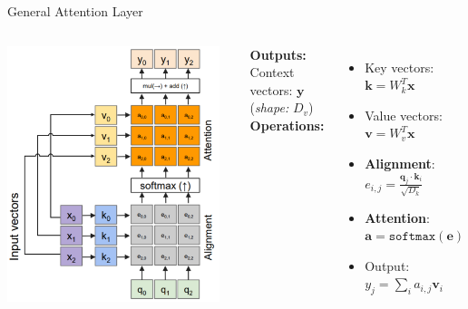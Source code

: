 \documentclass[serif, aspectratio=169]{beamer}
\begin{document}
\begin{frame}{General Attention Layer}
	\begin{columns}
		
		\includegraphics[width=0.95\textwidth]{pic/General-Attention-Layer-1.png}
		
		\textbf{Outputs:} \\
		Context vectors: $\mathbf{y}$ (\textit{shape: } $D_v$) \\[1em]
		
		\textbf{Operations:}
		\begin{itemize}
			\item Key vectors: $\mathbf{k} = W_k^T \mathbf{x}$
			\item Value vectors: $\mathbf{v} = W_v^T \mathbf{x}$
			\item \textbf{Alignment}: $e_{i,j} = \frac{\mathbf{q}_j \cdot \mathbf{k}_i}{\sqrt{D_k}}$
			\item \textbf{Attention}: $\mathbf{a} = \texttt{softmax}(\mathbf{e})$
			\item Output: $y_j = \sum_i a_{i,j} \mathbf{v}_i$
		\end{itemize}
		

\end{columns}
\end{frame}
\end{document}
